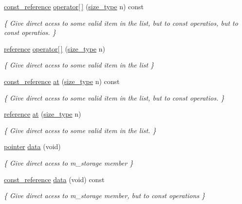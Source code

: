\begin{DoxyCompactItemize}
\hyperlink{classvector_aad263433b4072dfbc26ace0df6441960}{const\+\_\+reference} \hyperlink{classvector_a8127cc4c6e036ba2f5ee3b9b27f8d24b}{operator\mbox{[}$\,$\mbox{]}} (\hyperlink{classvector_a4d06f3ade0c2ac023b7a7edb85d9d1ef}{size\+\_\+type} n) const
\begin{DoxyCompactList}\small\item\em \{ Give direct acess to some valid item in the list, but to const operatios, but to const operatios. \} \end{DoxyCompactList}\item 
\hyperlink{classvector_a068ad546247a09ea9dd025658ad69348}{reference} \hyperlink{classvector_a8cc9714a4fd45142153af746fe39aeb2}{operator\mbox{[}$\,$\mbox{]}} (\hyperlink{classvector_a4d06f3ade0c2ac023b7a7edb85d9d1ef}{size\+\_\+type} n)
\begin{DoxyCompactList}\small\item\em \{ Give direct acess to some valid item in the list \} \end{DoxyCompactList}\item 
\hyperlink{classvector_aad263433b4072dfbc26ace0df6441960}{const\+\_\+reference} \hyperlink{classvector_a447aea9f88801ad5005b9fbd4c0aaf71}{at} (\hyperlink{classvector_a4d06f3ade0c2ac023b7a7edb85d9d1ef}{size\+\_\+type} n) const
\begin{DoxyCompactList}\small\item\em \{ Give direct acess to some valid item in the list, but to const operatios. \} \end{DoxyCompactList}\item 
\hyperlink{classvector_a068ad546247a09ea9dd025658ad69348}{reference} \hyperlink{classvector_ad72a222490a6dcb55d0d22287b8f6f51}{at} (\hyperlink{classvector_a4d06f3ade0c2ac023b7a7edb85d9d1ef}{size\+\_\+type} n)
\begin{DoxyCompactList}\small\item\em \{ Give direct acess to some valid item in the list. \} \end{DoxyCompactList}\item 
\hyperlink{classvector_a6826d03fa03dbe9e6e21328770c2f308}{pointer} \hyperlink{classvector_a6b02121f443657a7462a2f2a7fcae1d4}{data} (void)
\begin{DoxyCompactList}\small\item\em \{ Give direct acess to m\+\_\+storage member \} \end{DoxyCompactList}\item 
\hyperlink{classvector_aad263433b4072dfbc26ace0df6441960}{const\+\_\+reference} \hyperlink{classvector_adafc81f5b3fab39c4d61cae75615a4fa}{data} (void) const
\begin{DoxyCompactList}\small\item\em \{ Give direct acess to m\+\_\+storage member, but to const operations \} \end{DoxyCompactList}\end{DoxyCompactItemize}
